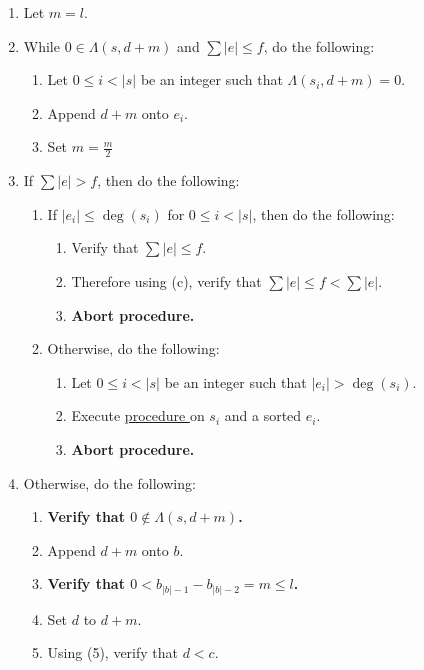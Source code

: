 \documentclass{article}
\newcounter{procedure}[part]
\newcommand{\procedurehr}[1]{\hyperref[sec:procedure #1]{procedure \expandafter\csname procedure#1\endcsname}}
\begin{document}
\begin{multicols}{2}
\begin{enumerate}
\begin{enumerate}
						\item Let $m=l$.
						\item While $0\in\Lambda(s,d+m)$ and $\sum\lvert e\rvert\le f$, do the following:
						\begin{enumerate}
							\item Let $0\le i<\lvert s\rvert$ be an integer such that $\Lambda(s_i,d+m)=0$.
							\item Append $d+m$ onto $e_i$.
							\item Set $m=\frac{m}{2}$
						\end{enumerate}
						\item If $\sum\lvert e\rvert>f$, then do the following:
						\begin{enumerate}
							\item If $\lvert e_i\rvert\le\deg(s_i)$ for $0\le i<\lvert s\rvert$, then do the following:
							\begin{enumerate}
								\item Verify that $\sum\lvert e\rvert\le f$.
								\item Therefore using (c), verify that $\sum\lvert e\rvert\le f<\sum\lvert e\rvert$.
								\item \textbf{Abort procedure.}
							\end{enumerate}
							\item Otherwise, do the following:
							\begin{enumerate}
								\item Let $0\le i<\lvert s\rvert$ be an integer such that $\lvert e_i\rvert>\deg(s_i)$.
								\item Execute \procedurehr{2.16} on $s_i$ and a sorted $e_i$.
								\item \textbf{Abort procedure.}
							\end{enumerate}
						\end{enumerate}
						\item Otherwise, do the following:
						\begin{enumerate}
							\item \textbf{Verify that $0\not\in\Lambda(s,d+m)$.}
							\item Append $d+m$ onto $b$.
							\item \textbf{Verify that $0<b_{\lvert b\rvert-1}-b_{\lvert b\rvert-2}=m\le l$.}
							\item Set $d$ to $d+m$.
							\item Using (5), verify that $d<c$.
						\end{enumerate}
					\end{enumerate}

\end{enumerate}
\end{multicols}
\end{document}
